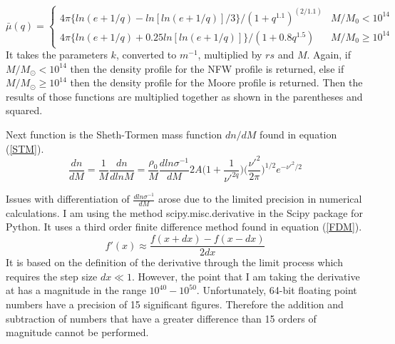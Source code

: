 \documentclass[12pt]{article}
\begin{document}
\begin{equation} \label{DP}
	\bar{\mu}(q) =
	\begin{cases}
		4\pi\{ln(e+1/q)-ln[ln(e+1/q)]/3\} / (1+q^{1.1})^{(2/1.1)} & M/M_0 < 10^{14} \\
		4\pi\{ln(e+1/q)+0.25ln[ln(e+1/q)]\} / (1+0.8q^{1.5})      & M/M_0 \geq 10^{14}
	\end{cases}
\end{equation}
It takes the parameters $k$, converted to $m^{-1}$, multiplied by $rs$ and $M$. Again, if $M/M_\odot < 10^{14}$ then the density profile for the NFW profile is returned, else if  $M/M_\odot \geq 10^{14}$ then the density profile for the Moore profile is returned. Then the results of those functions are multiplied together as shown in the parentheses and squared.

Next function is the Sheth-Tormen mass function $dn/dM$ found in equation (\ref{STM}).
\begin{equation} \label{STM}
	\frac{dn}{dM} = \frac{1}{M} \frac{dn}{dlnM} = \frac{\rho_{0}}{M} \frac{d ln \sigma^{-1}}{dM} 2A  \Big (1 + \frac{1}{\nu'^{2q}} \Big) \Big(\frac{\nu'^{2}}{2 \pi} \Big)^{1/2} e^{-\nu'^{2} / 2}
\end{equation}

Issues with differentiation of $\frac{d ln \sigma^{-1}}{dM}$ arose due to the limited precision in numerical calculations. I am using the method scipy.misc.derivative in the Scipy package for Python. It uses a third order finite difference method found in equation (\ref{FDM}).
\begin{equation} \label{FDM}
	f'(x) \approx \frac{f(x+dx) - f(x-dx)}{2dx}
\end{equation} 
It is based on the definition of the derivative through the limit process which requires the step size $dx \ll 1$. However, the point that I am taking the derivative at has a magnitude in the range $10^{40}-10^{50}$. Unfortunately, 64-bit floating point numbers have a precision of 15 significant figures. Therefore the addition and subtraction of numbers that have a greater difference than 15 orders of magnitude cannot be performed.
\end{document}
